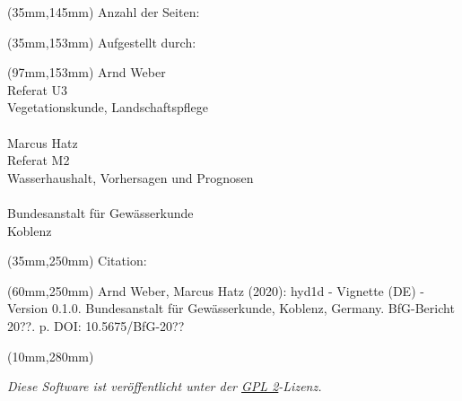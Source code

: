 \begin{titlepage}
    \begin{textblock*}{150mm}(35mm,145mm)
    \fontsize{15}{17}\selectfont\noindent
    Anzahl der Seiten: \pageref{LastPage}
    \end{textblock*}

    \begin{textblock*}{150mm}(35mm,153mm)
    \fontsize{15}{17}\selectfont\noindent
    Aufgestellt durch:
    \end{textblock*}

    \begin{textblock*}{85mm}(97mm,153mm)
    \fontsize{15}{17}\selectfont\noindent
    Arnd Weber \\
    Referat U3 \\
    Vegetationskunde, Landschaftspflege \\
    \\
    Marcus Hatz \\
    Referat M2 \\
    Wasserhaushalt, Vorhersagen und Prognosen \\
    \\
    Bundesanstalt für Gewässerkunde \\
    Koblenz \\
    \end{textblock*}

    \begin{textblock*}{150mm}(35mm,250mm)
    \fontsize{10}{12}\selectfont\noindent
    Citation:
    \end{textblock*}

    \begin{textblock*}{120mm}(60mm,250mm)
    \fontsize{10}{12}\selectfont\noindent
    Arnd Weber, Marcus Hatz (2020): hyd1d - Vignette (DE) - Version 0.1.0. Bundesanstalt für Gewässerkunde, Koblenz, Germany. BfG-Bericht 20??. \pageref*{LastPage} p. DOI: 10.5675/BfG-20??
    \end{textblock*}

    \begin{textblock*}{190mm}(10mm,280mm)
    \fontsize{8}{9}\selectfont\noindent
    \begin{center}
    \textit{Diese Software ist veröffentlicht unter der \href{https://www.gnu.org/licenses/gpl-2.0}{GPL 2}-Lizenz.}
    \end{center}
    \end{textblock*}
    ~
\end{titlepage}

\newpage

